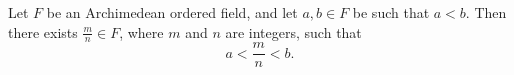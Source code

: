 Let \(F\) be an Archimedean ordered field, and let \(a, b \in F\) be such that \(a < b\). Then there exists \(\frac{m}{n} \in F\), where \(m\) and \(n\) are integers, such that
\[
a < \frac{m}{n} < b.
\]